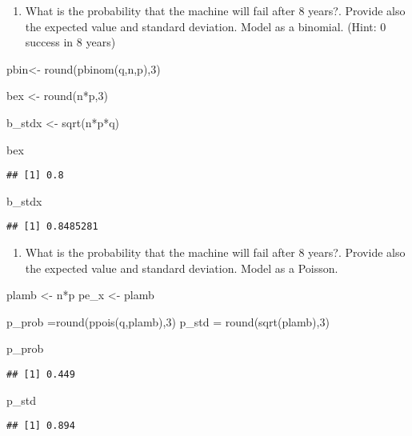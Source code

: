 \documentclass[
]{article}
\newenvironment{Shaded}{\begin{snugshade}}{\end{snugshade}}
\newcommand{\DecValTok}[1]{\textcolor[rgb]{0.00,0.00,0.81}{#1}}
\newcommand{\FunctionTok}[1]{\textcolor[rgb]{0.00,0.00,0.00}{#1}}
\newcommand{\NormalTok}[1]{#1}
\newcommand{\OtherTok}[1]{\textcolor[rgb]{0.56,0.35,0.01}{#1}}
\newcommand{\SpecialCharTok}[1]{\textcolor[rgb]{0.00,0.00,0.00}{#1}}
\providecommand{\tightlist}{%
  \setlength{\itemsep}{0pt}\setlength{\parskip}{0pt}}
\begin{document}
\begin{enumerate}
\def\labelenumi{\alph{enumi}.}
\setcounter{enumi}{2}
\tightlist
\item
  What is the probability that the machine will fail after 8 years?.
  Provide also the expected value and standard deviation. Model as a
  binomial. (Hint: 0 success in 8 years)
\end{enumerate}

\begin{Shaded}
\begin{Highlighting}[]
\NormalTok{pbin}\OtherTok{\textless{}{-}} \FunctionTok{round}\NormalTok{(}\FunctionTok{pbinom}\NormalTok{(q,n,p),}\DecValTok{3}\NormalTok{)}

\NormalTok{bex }\OtherTok{\textless{}{-}} \FunctionTok{round}\NormalTok{(n}\SpecialCharTok{*}\NormalTok{p,}\DecValTok{3}\NormalTok{)}

\NormalTok{b\_stdx }\OtherTok{\textless{}{-}} \FunctionTok{sqrt}\NormalTok{(n}\SpecialCharTok{*}\NormalTok{p}\SpecialCharTok{*}\NormalTok{q)}

\NormalTok{bex}
\end{Highlighting}
\end{Shaded}

\begin{verbatim}
## [1] 0.8
\end{verbatim}

\begin{Shaded}
\begin{Highlighting}[]
\NormalTok{b\_stdx }
\end{Highlighting}
\end{Shaded}

\begin{verbatim}
## [1] 0.8485281
\end{verbatim}

\begin{enumerate}
\def\labelenumi{\alph{enumi}.}
\setcounter{enumi}{3}
\tightlist
\item
  What is the probability that the machine will fail after 8 years?.
  Provide also the expected value and standard deviation. Model as a
  Poisson.
\end{enumerate}

\begin{Shaded}
\begin{Highlighting}[]
\NormalTok{plamb }\OtherTok{\textless{}{-}}\NormalTok{ n}\SpecialCharTok{*}\NormalTok{p}
\NormalTok{pe\_x }\OtherTok{\textless{}{-}}\NormalTok{ plamb}

\NormalTok{p\_prob }\OtherTok{=}\FunctionTok{round}\NormalTok{(}\FunctionTok{ppois}\NormalTok{(q,plamb),}\DecValTok{3}\NormalTok{)}
\NormalTok{p\_std }\OtherTok{=} \FunctionTok{round}\NormalTok{(}\FunctionTok{sqrt}\NormalTok{(plamb),}\DecValTok{3}\NormalTok{)}

\NormalTok{p\_prob}
\end{Highlighting}
\end{Shaded}

\begin{verbatim}
## [1] 0.449
\end{verbatim}

\begin{Shaded}
\begin{Highlighting}[]
\NormalTok{p\_std}
\end{Highlighting}
\end{Shaded}

\begin{verbatim}
## [1] 0.894
\end{verbatim}
\end{document}
